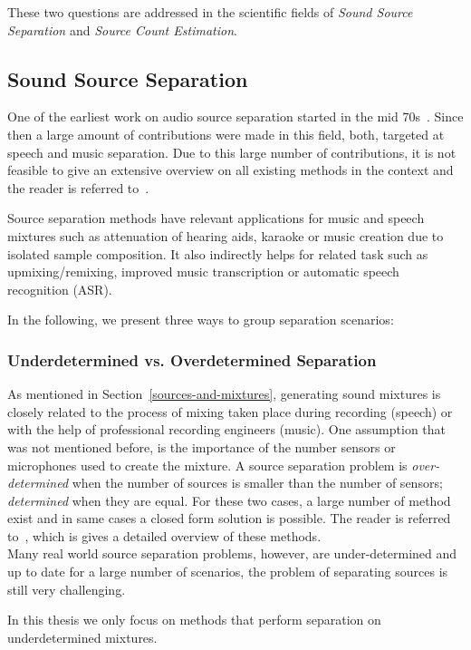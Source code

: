 These two questions are addressed in the scientific fields of \emph{Sound Source Separation} and \emph{Source Count Estimation}.

\subsection{Sound Source Separation}

One of the earliest work on audio source separation started in the mid 70s~\cite{miller73}.
Since then a large amount of contributions were made in this field, both, targeted at speech and music separation.
Due to this large number of contributions, it is not feasible to give an extensive overview on all existing methods in the context and the reader is referred to~\cite{vincent18, comon10, rafii}.
\par
Source separation methods have relevant applications for music and speech mixtures such as attenuation of hearing aids, karaoke or music creation due to isolated sample composition.
It also indirectly helps for related task such as upmixing/remixing, improved music transcription or automatic speech recognition (ASR). 
\par
In the following, we present three ways to group separation scenarios:

\subsubsection*{Underdetermined vs. Overdetermined Separation}
As mentioned in Section~\ref{sources-and-mixtures}, generating sound mixtures is closely related to the process of mixing taken place during recording (speech) or with the help of professional recording engineers (music).
One assumption that was not mentioned before, is the importance of the number sensors or microphones used to create the mixture.
A source separation problem is \emph{over-determined} when the number of sources is smaller than the number of sensors; \emph{determined} when they are equal.
For these two cases, a large number of method exist and in same cases a closed form solution is possible.
The reader is referred to~\cite{common10}, which is gives a detailed overview of these methods.\\
Many real world source separation problems, however, are under-determined and up to date for a large number of scenarios, the problem of separating sources is still very challenging.
\par
In this thesis we only focus on methods that perform separation on underdetermined mixtures.

